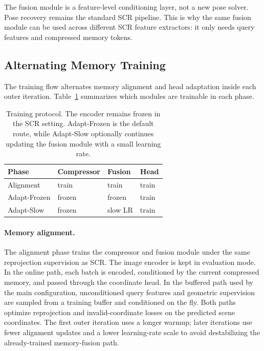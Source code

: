 \documentclass[letterpaper]{article} %
\begin{document}
The fusion module is a feature-level conditioning layer, not a new pose solver. Pose recovery remains the standard SCR pipeline. This is why the same fusion module can be used across different SCR feature extractors: it only needs query features and compressed memory tokens.

\subsection{Alternating Memory Training}

The training flow alternates memory alignment and head adaptation inside each outer iteration. Table~\ref{tab:training_protocol} summarizes which modules are trainable in each phase.

\begin{table}[t]
\centering
\caption{Training protocol. The encoder remains frozen in the SCR setting. Adapt-Frozen is the default route, while Adapt-Slow optionally continues updating the fusion module with a small learning rate.}
\label{tab:training_protocol}
\small
\begin{tabular}{llll}
\toprule
Phase & Compressor & Fusion & Head \\
\midrule
Alignment & train & train & train \\
Adapt-Frozen & frozen & frozen & train \\
Adapt-Slow & frozen & slow LR & train \\
\bottomrule
\end{tabular}
\end{table}

\paragraph{Memory alignment.}
The alignment phase trains the compressor and fusion module under the same reprojection supervision as SCR. The image encoder is kept in evaluation mode. In the online path, each batch is encoded, conditioned by the current compressed memory, and passed through the coordinate head. In the buffered path used by the main configuration, unconditioned query features and geometric supervision are sampled from a training buffer and conditioned on the fly. Both paths optimize reprojection and invalid-coordinate losses on the predicted scene coordinates. The first outer iteration uses a longer warmup; later iterations use fewer alignment updates and a lower learning-rate scale to avoid destabilizing the already-trained memory-fusion path.
\end{document}
